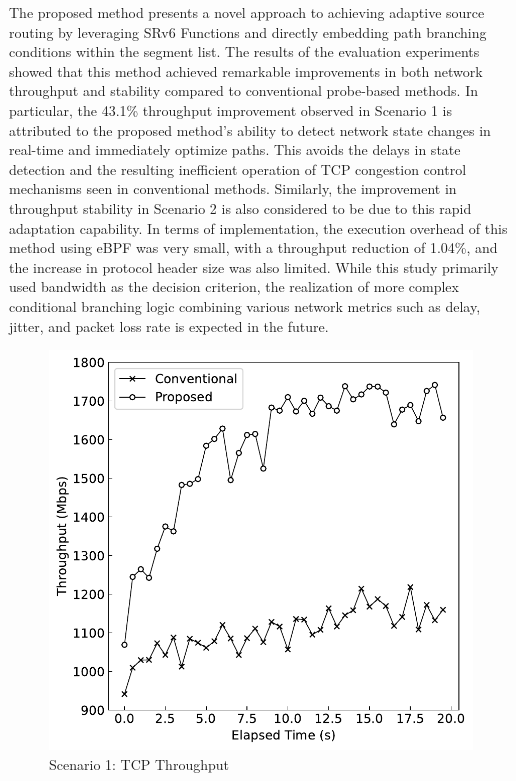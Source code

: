 \documentclass[conference]{IEEEtran}
\begin{document}
The proposed method presents a novel approach to achieving adaptive source routing by leveraging SRv6 Functions and directly embedding path branching conditions within the segment list.
The results of the evaluation experiments showed that this method achieved remarkable improvements in both network throughput and stability compared to conventional probe-based methods.
In particular, the 43.1\% throughput improvement observed in Scenario 1 is attributed to the proposed method's ability to detect network state changes in real-time and immediately optimize paths. This avoids the delays in state detection and the resulting inefficient operation of TCP congestion control mechanisms seen in conventional methods.
Similarly, the improvement in throughput stability in Scenario 2 is also considered to be due to this rapid adaptation capability.
In terms of implementation, the execution overhead of this method using eBPF was very small, with a throughput reduction of 1.04\%, and the increase in protocol header size was also limited.
While this study primarily used bandwidth as the decision criterion, the realization of more complex conditional branching logic combining various network metrics such as delay, jitter, and packet loss rate is expected in the future.

\begin{figure}[t]
  \centering
  \includegraphics[width=0.7\linewidth]{./figures/scenario-1.pdf}
  \caption{Scenario 1: TCP Throughput}
  \label{fig:scenario-1}
\end{figure}
\end{document}
